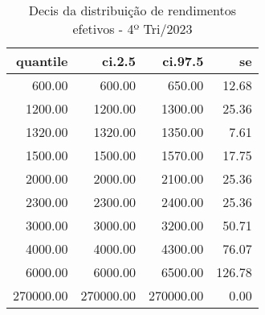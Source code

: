 \begin{table}[ht]
\centering
\begin{tabular}{rrrr}
  \hline
quantile & ci.2.5 & ci.97.5 & se \\ 
  \hline
600.00 & 600.00 & 650.00 & 12.68 \\ 
  1200.00 & 1200.00 & 1300.00 & 25.36 \\ 
  1320.00 & 1320.00 & 1350.00 & 7.61 \\ 
  1500.00 & 1500.00 & 1570.00 & 17.75 \\ 
  2000.00 & 2000.00 & 2100.00 & 25.36 \\ 
  2300.00 & 2300.00 & 2400.00 & 25.36 \\ 
  3000.00 & 3000.00 & 3200.00 & 50.71 \\ 
  4000.00 & 4000.00 & 4300.00 & 76.07 \\ 
  6000.00 & 6000.00 & 6500.00 & 126.78 \\ 
  270000.00 & 270000.00 & 270000.00 & 0.00 \\ 
   \hline
\end{tabular}
\caption{Decis da distribuição de rendimentos efetivos -
            4º Tri/2023} 
\label{sum}
\end{table}
